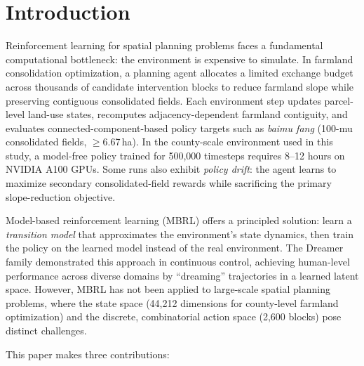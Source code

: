 \documentclass[11pt]{article}
\begin{document}
\section{Introduction}
\label{sec:intro}

Reinforcement learning for spatial planning problems faces a fundamental computational bottleneck: the environment is expensive to simulate. In farmland consolidation optimization, a planning agent allocates a limited exchange budget across thousands of candidate intervention blocks to reduce farmland slope while preserving contiguous consolidated fields. Each environment step updates parcel-level land-use states, recomputes adjacency-dependent farmland contiguity, and evaluates connected-component-based policy targets such as \textit{baimu fang} (100-mu consolidated fields, $\geq$6.67\,ha). In the county-scale environment used in this study, a model-free policy trained for 500{,}000 timesteps requires 8--12 hours on NVIDIA A100 GPUs. Some runs also exhibit \textit{policy drift}: the agent learns to maximize secondary consolidated-field rewards while sacrificing the primary slope-reduction objective.

Model-based reinforcement learning (MBRL) offers a principled solution: learn a \textit{transition model} that approximates the environment's state dynamics, then train the policy on the learned model instead of the real environment. The Dreamer family \citep{hafner2023dreamerv3} demonstrated this approach in continuous control, achieving human-level performance across diverse domains by ``dreaming'' trajectories in a learned latent space. However, MBRL has not been applied to large-scale spatial planning problems, where the state space (44{,}212 dimensions for county-level farmland optimization) and the discrete, combinatorial action space (2{,}600 blocks) pose distinct challenges.

This paper makes three contributions:
\end{document}
